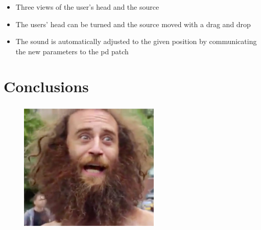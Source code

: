 \documentclass{beamer}
\begin{document}
	\begin{frame}
		\frametitle{\insertsection}
		\begin{itemize}
			\item Three views of the user's head and the source
			\item The users' head can be turned and the source moved with a drag and drop
			\item The sound is automatically adjusted to the given position by communicating the
				new parameters to the pd patch
		\end{itemize}
	\end{frame}

	\section{Conclusions}

	\begin{frame}
		\frametitle{\insertsection}
		\begin{figure}
			\centering
			\includegraphics[width=0.6\textwidth]{images/alas.jpg}
		\end{figure}
	\end{frame}
\end{document}
